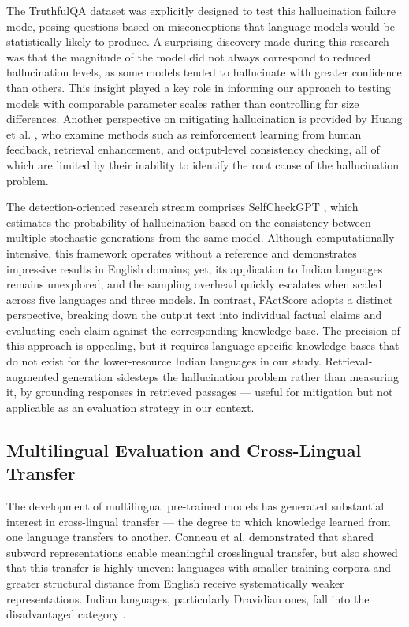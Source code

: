\documentclass[conference]{IEEEtran}
\begin{document}
The TruthfulQA dataset \cite{b1} was explicitly designed
to test this hallucination failure mode, posing questions based on
misconceptions that language models would be statistically likely
to produce. A surprising discovery made during this research was that the magnitude of the model did not always correspond to reduced hallucination levels, as some models tended to hallucinate with greater confidence than others.
This insight played a key role in informing our approach to
testing models with comparable parameter scales rather than controlling for size differences. Another perspective on mitigating hallucination is provided by Huang et al. \cite{b22}, who examine methods such as reinforcement learning from human feedback, retrieval enhancement, and output-level consistency checking,
all of which are limited by their inability to identify the root cause of the hallucination problem.

The detection-oriented research stream comprises SelfCheckGPT \cite{b16}, which estimates the probability of hallucination based on the consistency between multiple stochastic generations from the same model. Although computationally intensive, this framework operates without a reference and demonstrates impressive results in English domains; yet, its application to Indian languages remains unexplored, and the sampling overhead quickly escalates when scaled across five languages and three models. In contrast, FActScore \cite{b23} adopts a distinct perspective, breaking down the output text into individual factual claims and evaluating each claim against the corresponding knowledge base. The precision
of this approach is appealing, but it requires language-specific
knowledge bases that do not exist for the lower-resource Indian
languages in our study. Retrieval-augmented generation \cite{b11}
sidesteps the hallucination problem rather than measuring it,
by grounding responses in retrieved passages — useful for
mitigation but not applicable as an evaluation strategy in our
context.


\subsection{Multilingual Evaluation and Cross-Lingual Transfer}

The development of multilingual pre-trained models has
generated substantial interest in cross-lingual transfer —
the degree to which knowledge learned from one language
transfers to another. Conneau et al. \cite{b7} demonstrated that
shared subword representations enable meaningful crosslingual transfer, but also showed that this transfer is highly
uneven: languages with smaller training corpora and greater
structural distance from English receive systematically weaker
representations. Indian languages, particularly Dravidian ones,
fall into the disadvantaged category \cite{b24}.
\end{document}
